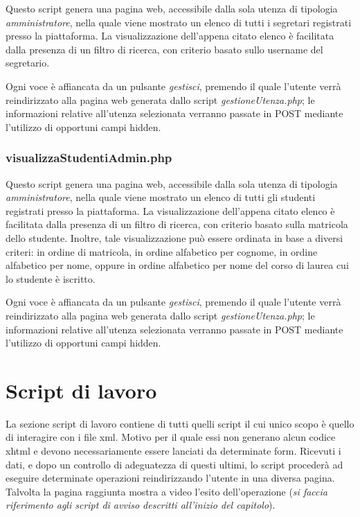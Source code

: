 \documentclass [a4paper,11pt]{book}
\begin{document}
Questo script genera una pagina web, accessibile dalla sola utenza di tipologia \emph{amministratore}, nella quale viene mostrato un elenco di tutti i segretari registrati presso la piattaforma. La visualizzazione dell'appena citato elenco è facilitata dalla presenza di un filtro di ricerca, con criterio basato sullo username del segretario.

Ogni voce è affiancata da un pulsante \emph{gestisci}, premendo il quale l'utente verrà reindirizzato alla pagina web generata dallo script \emph{gestioneUtenza.php}; le informazioni relative all'utenza selezionata verranno passate in POST mediante l'utilizzo di opportuni campi hidden.

\medskip

\subsubsection{visualizzaStudentiAdmin.php}

Questo script genera una pagina web, accessibile dalla sola utenza di tipologia \emph{amministratore}, nella quale viene mostrato un elenco di tutti gli studenti registrati presso la piattaforma. La visualizzazione dell'appena citato elenco è facilitata dalla presenza di un filtro di ricerca, con criterio basato sulla matricola dello studente. Inoltre, tale visualizzazione può essere ordinata in base a diversi criteri: in ordine di matricola, in ordine alfabetico per cognome, in ordine alfabetico per nome, oppure in ordine alfabetico per nome del corso di laurea cui lo studente è iscritto.

Ogni voce è affiancata da un pulsante \emph{gestisci}, premendo il quale l'utente verrà reindirizzato alla pagina web generata dallo script \emph{gestioneUtenza.php}; le informazioni relative all'utenza selezionata verranno passate in POST mediante l'utilizzo di opportuni campi hidden.

\medskip

\section{Script di lavoro}

La sezione script di lavoro contiene di tutti quelli script il cui unico scopo è quello di interagire con i file xml. Motivo per il quale essi non generano alcun codice xhtml e devono necessariamente essere lanciati da determinate form. 
Ricevuti i dati, e dopo un controllo di adeguatezza di questi ultimi, lo script procederà ad eseguire determinate operazioni reindirizzando l'utente in una diversa pagina. 
Talvolta la pagina raggiunta mostra a video l'esito dell'operazione (\emph{si faccia riferimento agli script di avviso descritti all'inizio del capitolo}). 
\medskip
\end{document}
